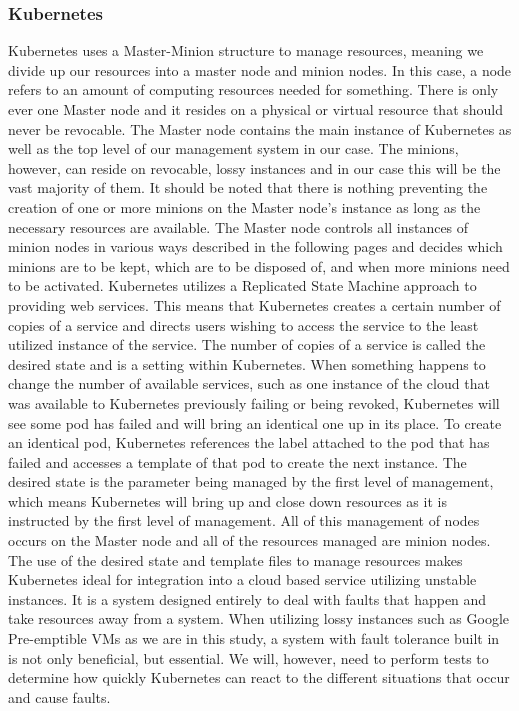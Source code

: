 \documentclass[thesis,proposal]{umassthesis}  %
\begin{document}
\subsubsection{Kubernetes}
	Kubernetes uses a Master-Minion structure to manage resources, meaning we divide up our resources into a master node and minion nodes. In this case, a node refers to an amount of computing resources needed for something. There is only ever one Master node and it resides on a physical or virtual resource that should never be revocable. The Master node contains the main instance of Kubernetes as well as the top level of our management system in our case. The minions, however, can reside on revocable, lossy instances and in our case this will be the vast majority of them. It should be noted that there is nothing preventing the creation of one or more minions on the Master node’s instance as long as the necessary resources are available. The Master node controls all instances of minion nodes in various ways described in the following pages and decides which minions are to be kept, which are to be disposed of, and when more minions need to be activated.
Kubernetes utilizes a Replicated State Machine approach to providing web services. This means that Kubernetes creates a certain number of copies of a service and directs users wishing to access the service to the least utilized instance of the service. The number of copies of a service is called the desired state and is a setting within Kubernetes. When something happens to change the number of available services, such as one instance of the cloud that was available to Kubernetes previously failing or being revoked, Kubernetes will see some pod has failed and will bring an identical one up in its place. To create an identical pod, Kubernetes references the label attached to the pod that has failed and accesses a template of that pod to create the next instance. The desired state is the parameter being managed by the first level of management, which means Kubernetes will bring up and close down resources as it is instructed by the first level of management. All of this management of nodes occurs on the Master node and all of the resources managed are minion nodes.
	The use of the desired state and template files to manage resources makes Kubernetes ideal for integration into a cloud based service utilizing unstable instances. It is a system designed entirely to deal with faults that happen and take resources away from a system. When utilizing lossy instances such as Google Pre-emptible VMs as we are in this study, a system with fault tolerance built in is not only beneficial, but essential. We will, however, need to perform tests to determine how quickly Kubernetes can react to the different situations that occur and cause faults.
\end{document}
